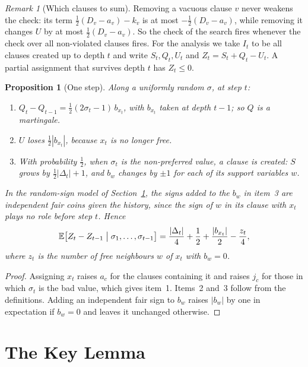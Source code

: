 \documentclass[11pt,a4paper]{article}
\newtheorem{proposition}[theorem]{Proposition}
\theoremstyle{definition}
\theoremstyle{remark}
\newtheorem{remark}[theorem]{Remark}
\newcommand{\E}{\mathbb{E}}
\begin{document}
\begin{remark}[Which clauses to sum]\label{rem:vacuous}
Removing a vacuous clause $v$ never weakens the check: its term
$\frac12(D_v-a_v)-k_v$ is at most $-\frac12(D_v-a_v)$, while removing it changes
$U$ by at most $\frac12(D_v-a_v)$. So the check of the search fires whenever
the check over all non-violated clauses fires. For the analysis we take $I_t$
to be all clauses created up to depth $t$ and write $S_t,Q_t,U_t$ and
$Z_t=S_t+Q_t-U_t$. A partial assignment that survives depth $t$ has
$Z_t\le0$.
\end{remark}

\begin{proposition}[One step]\label{prop:step}
Along a uniformly random $\sigma$, at step $t$:
\begin{enumerate}
 \item $Q_t-Q_{t-1}=\frac12(2\sigma_t-1)\,b_{x_t}$, with $b_{x_t}$ taken at
 depth $t-1$; so $Q$ is a martingale.
 \item $U$ loses $\frac12|b_{x_t}|$, because $x_t$ is no longer free.
 \item With probability $\frac12$, when $\sigma_t$ is the non-preferred value,
 a clause is created: $S$ grows by $\frac12|\Delta_t|+1$, and $b_w$ changes by
 $\pm1$ for each of its support variables $w$.
\end{enumerate}
In the random-sign model of Section~\ref{sec:key}, the signs added to the $b_w$
in item~3 are independent fair coins given the history, since the sign of $w$
in its clause with $x_t$ plays no role before step $t$. Hence
\[
 \E\bigl[Z_t-Z_{t-1}\bigm|\sigma_1,\dots,\sigma_{t-1}\bigr]
 =\frac{|\Delta_t|}4+\frac12+\frac{|b_{x_t}|}2-\frac{z_t}4,
\]
where $z_t$ is the number of free neighbours $w$ of $x_t$ with $b_w=0$.
\end{proposition}

\begin{proof}
Assigning $x_t$ raises $a_c$ for the clauses containing it and raises $j_c$ for
those in which $\sigma_t$ is the bad value, which gives item~1. Items~2 and~3
follow from the definitions. Adding an independent fair sign to $b_w$ raises
$|b_w|$ by one in expectation if $b_w=0$ and leaves it unchanged otherwise.
\end{proof}

\section{The Key Lemma}\label{sec:key}
\end{document}
